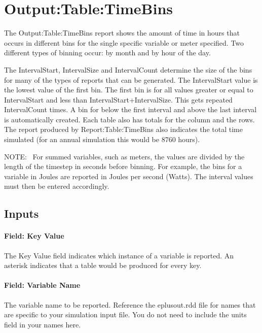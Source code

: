 \section{Output:Table:TimeBins}\label{outputtabletimebins}

The Output:Table:TimeBins report shows the amount of time in hours that occurs in different bins for the single specific variable or meter specified. Two different types of binning occur: by month and by hour of the day.

The IntervalStart, IntervalSize and IntervalCount determine the size of the bins for many of the types of reports that can be generated. The IntervalStart value is the lowest value of the first bin. The first bin is for all values greater or equal to IntervalStart and less than IntervalStart+IntervalSize. This gets repeated IntervalCount times. A bin for below the first interval and above the last interval is automatically created. Each table also has totals for the column and the rows. The report produced by Report:Table:TimeBins also indicates the total time simulated (for an annual simulation this would be 8760 hours).

NOTE:~ For summed variables, such as meters, the values are divided by the length of the timestep in seconds before binning. For example, the bins for a variable in Joules are reported in Joules per second (Watts). The interval values must then be entered accordingly.

\subsection{Inputs}\label{inputs-065}

\paragraph{Field: Key Value}\label{field-key-value-000}

The Key Value field indicates which instance of a variable is reported. An asterisk indicates that a table would be produced for every key.

\paragraph{Field: Variable Name}\label{field-variable-name-000}

The variable name to be reported. Reference the eplusout.rdd file for names that are specific to your simulation input file. You do not need to include the units \protect\hyperlink{section-1}{} field in your names here.

